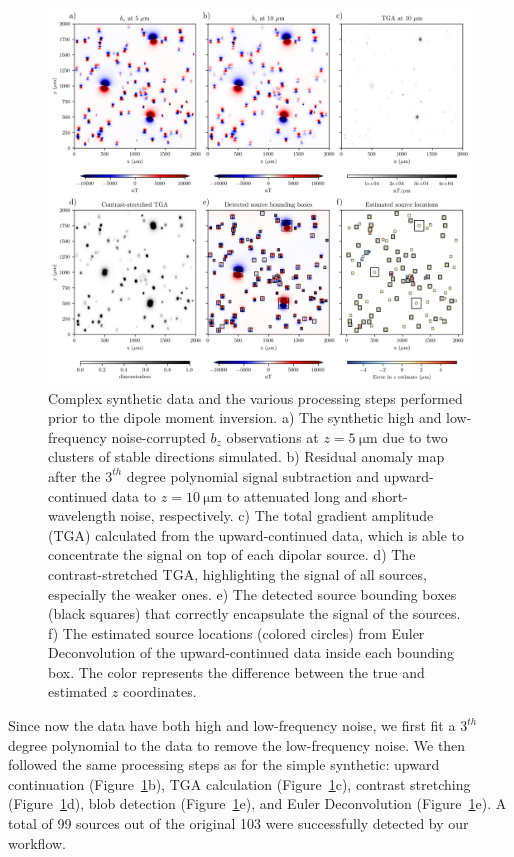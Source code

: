 \begin{figure}[tb!]
  \centering
  \includegraphics[width=1\linewidth]{figures/complex-synthetic-data.png}
  \caption{
    Complex synthetic data and the various processing steps performed prior to the dipole moment inversion.
    a) The synthetic high and low-frequency noise-corrupted $b_z$ observations at
    $z = \qty{5}{\micro\meter}$ due to two clusters of stable directions simulated.
    b) Residual anomaly map after the $3^{th}$ degree polynomial signal subtraction and upward-continued data to $z = \qty{10}{\micro\meter}$ to attenuated long and short-wavelength noise, respectively.
    c) The total gradient amplitude (TGA) calculated from the
    upward-continued data, which is able to concentrate the signal on top
    of each dipolar source.
    d) The contrast-stretched TGA, highlighting the signal of all sources, especially the weaker ones.
    e) The detected source bounding boxes (black squares) that correctly
    encapsulate the signal of the sources.
    f) The estimated source locations (colored circles) from Euler
    Deconvolution of the upward-continued data inside each bounding box.
    The color represents the difference between the true and estimated
    $z$ coordinates.
  }
  \label{complex-synthetic-data}
\end{figure}

Since now the data have both high and low-frequency noise, we first fit a $3^{th}$ degree polynomial to the data to remove the low-frequency noise.
We then followed the same processing steps as for the simple synthetic: upward continuation (Figure~\ref{complex-synthetic-data}b),
TGA calculation (Figure~\ref{complex-synthetic-data}c), contrast stretching (Figure~\ref{complex-synthetic-data}d), blob detection (Figure~\ref{complex-synthetic-data}e), and Euler Deconvolution (Figure~\ref{complex-synthetic-data}e).
A total of 99 sources out of the original 103 were successfully detected by our workflow.

